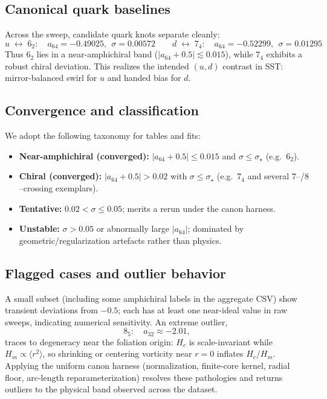 \subsection{Canonical quark baselines}
Across the sweep, candidate quark knots separate cleanly:
\[
	\boxed{u\;\leftrightarrow\;6_2:\quad a_{64}=-0.49025,\ \ \sigma=0.00572}
	\qquad
	\boxed{d\;\leftrightarrow\;7_4:\quad a_{64}=-0.52299,\ \ \sigma=0.01295}
\]
Thus \(6_2\) lies in a near-amphichiral band (\(|a_{64}+0.5|\!\lesssim\!0.015\)), while \(7_4\) exhibits a robust chiral deviation. This realizes the intended \((u,d)\) contrast in SST: mirror-balanced swirl for \(u\) and handed bias for \(d\).

\subsection{Convergence and classification}
We adopt the following taxonomy for tables and fits:
\begin{itemize}
	\item \textbf{Near-amphichiral (converged):} \(|a_{64}+0.5|\le 0.015\) and \(\sigma\le\sigma_\star\) (e.g.\ \(6_2\)).
	\item \textbf{Chiral (converged):} \(|a_{64}+0.5|>0.02\) with \(\sigma\le\sigma_\star\) (e.g.\ \(7_4\) and several \(7\)–/\(8\)–crossing exemplars).
	\item \textbf{Tentative:} \(0.02<\sigma\le 0.05\); merits a rerun under the canon harness.
	\item \textbf{Unstable:} \(\sigma>0.05\) or abnormally large \(|a_{64}|\); dominated by geometric/regularization artefacts rather than physics.
\end{itemize}

\subsection{Flagged cases and outlier behavior}
A small subset (including some amphichiral labels in the aggregate CSV) show transient deviations from \(-0.5\); each has at least one near-ideal value in raw sweeps, indicating numerical sensitivity. An extreme outlier,
\[
	8_5:\quad a_{32}\approx -2.01,
\]
traces to degeneracy near the foliation origin: \(H_c\) is scale-invariant while \(H_m\propto\langle r^2\rangle\), so shrinking or centering vorticity near \(r=0\) inflates \(H_c/H_m\). Applying the uniform canon harness (normalization, finite-core kernel, radial floor, arc-length reparameterization) resolves these pathologies and returns outliers to the physical band observed across the dataset.

